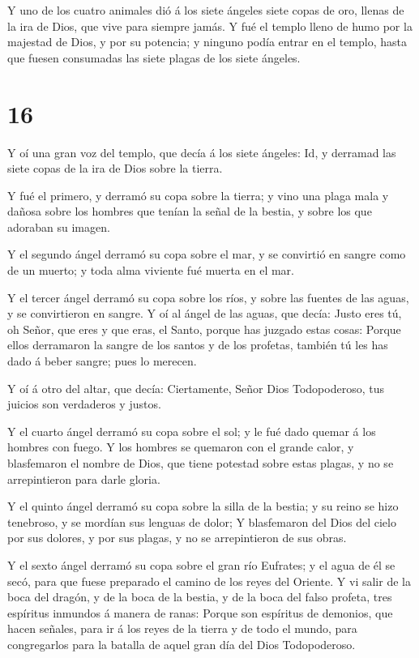  Y uno de los cuatro animales dió á los siete ángeles siete
copas de oro, llenas de la ira de Dios, que vive para siempre jamás.
 Y fué el templo lleno de humo por la majestad de Dios, y
por su potencia; y ninguno podía entrar en el templo, hasta que fuesen
consumadas las siete plagas de los siete ángeles.

\hypertarget{section-15}{%
\section{16}\label{section-15}}

 Y oí una gran voz del templo, que decía á los siete
ángeles: Id, y derramad las siete copas de la ira de Dios sobre la
tierra.

 Y fué el primero, y derramó su copa sobre la tierra; y vino
una plaga mala y dañosa sobre los hombres que tenían la señal de la
bestia, y sobre los que adoraban su imagen.

 Y el segundo ángel derramó su copa sobre el mar, y se
convirtió en sangre como de un muerto; y toda alma viviente fué muerta
en el mar.

 Y el tercer ángel derramó su copa sobre los ríos, y sobre
las fuentes de las aguas, y se convirtieron en sangre.  Y oí
al ángel de las aguas, que decía: Justo eres tú, oh Señor, que eres y
que eras, el Santo, porque has juzgado estas cosas:  Porque
ellos derramaron la sangre de los santos y de los profetas, también tú
les has dado á beber sangre; pues lo merecen.

 Y oí á otro del altar, que decía: Ciertamente, Señor Dios
Todopoderoso, tus juicios son verdaderos y justos.

 Y el cuarto ángel derramó su copa sobre el sol; y le fué
dado quemar á los hombres con fuego.  Y los hombres se
quemaron con el grande calor, y blasfemaron el nombre de Dios, que tiene
potestad sobre estas plagas, y no se arrepintieron para darle gloria.

 Y el quinto ángel derramó su copa sobre la silla de la
bestia; y su reino se hizo tenebroso, y se mordían sus lenguas de dolor;
 Y blasfemaron del Dios del cielo por sus dolores, y por
sus plagas, y no se arrepintieron de sus obras.

 Y el sexto ángel derramó su copa sobre el gran río
Eufrates; y el agua de él se secó, para que fuese preparado el camino de
los reyes del Oriente.  Y vi salir de la boca del dragón, y
de la boca de la bestia, y de la boca del falso profeta, tres espíritus
inmundos á manera de ranas:  Porque son espíritus de
demonios, que hacen señales, para ir á los reyes de la tierra y de todo
el mundo, para congregarlos para la batalla de aquel gran día del Dios
Todopoderoso.

